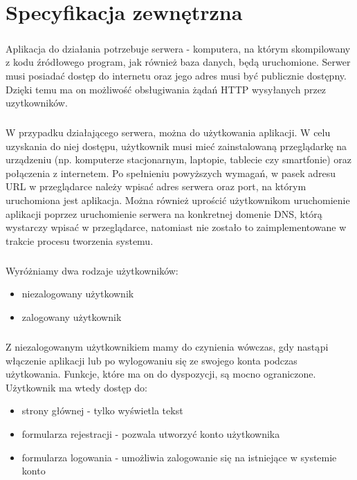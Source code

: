 \chapter{Specyfikacja zewnętrzna}
\label{ch:04}

\paragraph{}
Aplikacja do działania potrzebuje serwera - komputera, na którym skompilowany z kodu źródłowego program, jak również baza danych, będą uruchomione. Serwer musi posiadać dostęp do internetu oraz jego adres musi być publicznie dostępny. Dzięki temu ma on możliwość obsługiwania żądań HTTP wysyłanych przez uzytkowników.

\paragraph{}
W przypadku działającego serwera, można do użytkowania aplikacji. W celu uzyskania do niej dostępu, użytkownik musi mieć zainstalowaną przeglądarkę na urządzeniu (np. komputerze stacjonarnym, laptopie, tablecie czy smartfonie) oraz połączenia z internetem. Po spełnieniu powyższych wymagań, w pasek adresu URL w przeglądarce należy wpisać adres serwera oraz port, na którym uruchomiona jest aplikacja. Można również uprościć użytkownikom uruchomienie aplikacji poprzez uruchomienie serwera na konkretnej domenie DNS, którą wystarczy wpisać w przeglądarce, natomiast nie zostało to zaimplementowane w trakcie procesu tworzenia systemu.

\paragraph{}
Wyróżniamy dwa rodzaje użytkowników: 
\begin{itemize}
	\item niezalogowany użytkownik
	\item zalogowany użytkownik
\end{itemize}

\paragraph{}
Z niezalogowanym użytkownikiem mamy do czynienia wówczas, gdy nastąpi włączenie aplikacji lub po wylogowaniu się ze swojego konta podczas użytkowania. Funkcje, które ma on do dyspozycji, są mocno ograniczone. Użytkownik ma wtedy dostęp do:
\begin{itemize}
	\item strony głównej - tylko wyświetla tekst 
	\item formularza rejestracji - pozwala utworzyć konto użytkownika
	\item formularza logowania - umożliwia zalogowanie się na istniejące w systemie konto
\end{itemize}

